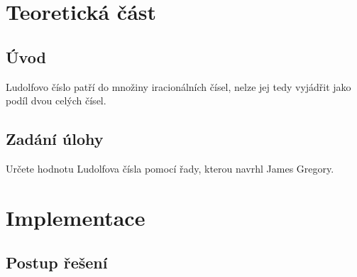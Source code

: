 \documentclass[11pt,a4paper,twoside,openright]{report}
\begin{document}
	
	
	
	\setcounter{tocdepth}{2}
	\tableofcontents
	
	\chapter{Teoretická část}
	\pagestyle{fancy}
	
	\section{Úvod}
	Ludolfovo číslo patří do množiny iracionálních čísel, nelze jej tedy vyjádřit jako podíl dvou celých čísel. 
	
	
	\section{Zadání úlohy}
	Určete hodnotu Ludolfova čísla pomocí řady, kterou navrhl James Gregory.
	
	\chapter{Implementace}
	\section{Postup řešení}
\end{document}
